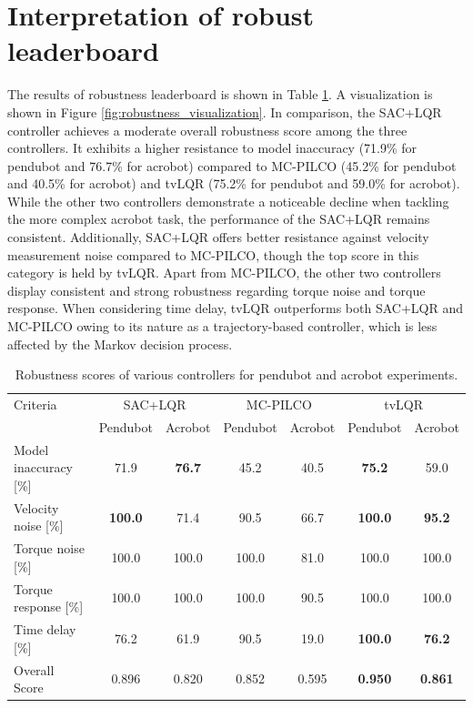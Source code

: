 \section{Interpretation of robust leaderboard}
The results of robustness leaderboard is shown in Table \ref{tab:robustness}. A visualization is shown in Figure \ref{fig:robustness_visualization}. In comparison, the SAC+LQR controller achieves a moderate overall robustness score among the three controllers. It exhibits a higher resistance to model inaccuracy (71.9\% for pendubot and 76.7\% for acrobot) compared to MC-PILCO (45.2\% for pendubot and 40.5\% for acrobot) and tvLQR (75.2\% for pendubot and 59.0\% for acrobot). While the other two controllers demonstrate a noticeable decline when tackling the more complex acrobot task, the performance of the SAC+LQR remains consistent. Additionally, SAC+LQR offers better resistance against velocity measurement noise compared to MC-PILCO, though the top score in this category is held by tvLQR. Apart from MC-PILCO, the other two controllers display consistent and strong robustness regarding torque noise and torque response. When considering time delay, tvLQR outperforms both SAC+LQR and MC-PILCO owing to its nature as a trajectory-based controller, which is less affected by the Markov decision process.

\begin{table}[H]
  \centering
 \begin{tabular}{lcccccc}
 \hline
 Criteria & \multicolumn{2}{c}{SAC+LQR} & \multicolumn{2}{c}{MC-PILCO} & \multicolumn{2}{c}{tvLQR} \\
 & Pendubot & Acrobot & Pendubot & Acrobot & Pendubot & Acrobot \\
 \hline
 Model inaccuracy [\%] & 71.9 & \textbf{76.7} & 45.2 & 40.5 & \textbf{75.2} & 59.0 \\
 Velocity noise [\%] & \textbf{100.0} & 71.4 & 90.5 & 66.7 & \textbf{100.0} & \textbf{95.2} \\
 Torque noise [\%] & 100.0 & 100.0 & 100.0 & 81.0 & 100.0 & 100.0 \\
 Torque response [\%] & 100.0 & 100.0 & 100.0 & 90.5 & 100.0 & 100.0 \\
 Time delay [\%] & 76.2 & 61.9 & 90.5 & 19.0 & \textbf{100.0} & \textbf{76.2} \\
 Overall Score & 0.896 & 0.820 & 0.852 & 0.595 & \textbf{0.950} & \textbf{0.861} \\
 \hline
 \end{tabular}
 \caption{Robustness scores of various controllers for pendubot and acrobot experiments.}
 \label{tab:robustness}
\end{table}


